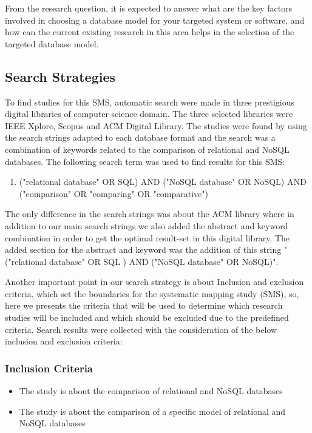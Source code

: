 \documentclass[sigconf,nonacm]{acmart}
\begin{document}
From the research question, it is expected to answer what are the key factors involved in choosing a database model for your targeted system or software, and how can the current existing research in this area helps in the selection of the targeted database model.

\subsection{Search Strategies}
To find studies for this SMS, automatic search were made in three prestigious digital libraries of computer science domain. The three selected libraries were IEEE Xplore, Scopus and ACM Digital Library.
The studies were found by using the search strings adapted to each database format and the search was a combination of keywords related to the comparison of relational and NoSQL databases. The following search term was used to find results for this SMS:
\bigbreak
\begin{enumerate}
\item ("relational database" OR SQL) AND ("NoSQL database" OR NoSQL) AND ("comparison" OR "comparing" OR "comparative")  
\end{enumerate}
\bigbreak
The only difference in the search strings was about the ACM library where in addition to our main search strings we also added the abstract and keyword combination in order to get the optimal result-set in this digital library. The added section for the abstract and keyword was the addition of this string "("relational database" OR SQL ) AND ("NoSQL database" OR NoSQL)".


Another important point in our search strategy is about Inclusion and exclusion criteria, which set the boundaries for the systematic mapping study (SMS), so, here we presents the criteria that will be used to determine which research studies will be included and which should be excluded due to the predefined criteria. Search results were collected with the consideration of the below inclusion and exclusion criteria:
\subsubsection{\textbf{Inclusion Criteria}}
\begin{itemize}
 \item  The study is about the comparison of relational and NoSQL databases
 \item  The study is about the comparison of a specific model of relational and NoSQL databases
 \end{itemize}
\end{document}
